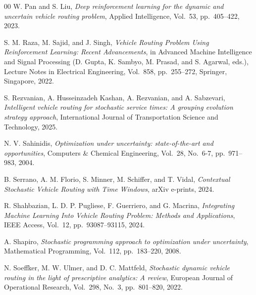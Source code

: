 \documentclass[preprint,12pt]{elsarticle}
\begin{document}
\begin{thebibliography}{00}
W. Pan and S. Liu,
\textit{Deep reinforcement learning for the dynamic and uncertain vehicle routing problem},
Applied Intelligence,
Vol.~53, pp.~405--422, 2023.

S. M. Raza, M. Sajid, and J. Singh,
\textit{Vehicle Routing Problem Using Reinforcement Learning: Recent Advancements},
in Advanced Machine Intelligence and Signal Processing (D. Gupta, K. Sambyo, M. Prasad, and S. Agarwal, eds.),
Lecture Notes in Electrical Engineering, Vol.~858, pp.~255--272,
Springer, Singapore, 2022.

S. Rezvanian, A. Husseinzadeh Kashan, A. Rezvanian, and A. Sabzevari,
\textit{Intelligent vehicle routing for stochastic service times: A grouping evolution strategy approach},
International Journal of Transportation Science and Technology,
2025.

N. V. Sahinidis,
\textit{Optimization under uncertainty: state-of-the-art and opportunities},
Computers \& Chemical Engineering,
Vol.~28, No.~6-7, pp.~971--983, 2004.

B. Serrano, A. M. Florio, S. Minner, M. Schiffer, and T. Vidal,
\textit{Contextual Stochastic Vehicle Routing with Time Windows},
arXiv e-prints, 2024.

R. Shahbazian, L. D. P. Pugliese, F. Guerriero, and G. Macrina,
\textit{Integrating Machine Learning Into Vehicle Routing Problem: Methods and Applications},
IEEE Access,
Vol.~12, pp.~93087--93115, 2024.

A. Shapiro,
\textit{Stochastic programming approach to optimization under uncertainty},
Mathematical Programming,
Vol.~112, pp.~183--220, 2008.

N. Soeffker, M. W. Ulmer, and D. C. Mattfeld,
\textit{Stochastic dynamic vehicle routing in the light of prescriptive analytics: A review},
European Journal of Operational Research,
Vol.~298, No.~3, pp.~801--820, 2022.

\end{thebibliography}
\end{document}
